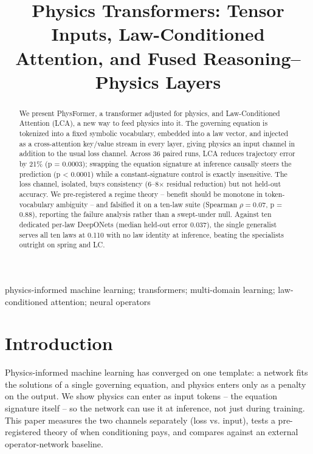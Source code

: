 \documentclass[conference,10pt]{IEEEtran}
\begin{document}
\title{Physics Transformers: Tensor Inputs, Law-Conditioned Attention, and Fused Reasoning--Physics Layers}

\author{
}

\maketitle

\begin{abstract}
We present PhysFormer, a transformer adjusted for physics, and Law-Conditioned Attention (LCA), a new way to feed physics into it. The governing equation is tokenized into a fixed symbolic vocabulary, embedded into a law vector, and injected as a cross-attention key/value stream in every layer, giving physics an input channel in addition to the usual loss channel. Across 36 paired runs, LCA reduces trajectory error by 21\% (p = 0.0003); swapping the equation signature at inference causally steers the prediction (p < 0.0001) while a constant-signature control is exactly insensitive. The loss channel, isolated, buys consistency (6--8$\times$ residual reduction) but not held-out accuracy. We pre-registered a regime theory -- benefit should be monotone in token-vocabulary ambiguity -- and falsified it on a ten-law suite (Spearman $\rho = 0.07$, p = 0.88), reporting the failure analysis rather than a swept-under null. Against ten dedicated per-law DeepONets (median held-out error 0.037), the single generalist serves all ten laws at 0.110 with no law identity at inference, beating the specialists outright on spring and LC.
\end{abstract}

\begin{IEEEkeywords}
physics-informed machine learning; transformers; multi-domain learning; law-conditioned attention; neural operators
\end{IEEEkeywords}

\section{Introduction}
Physics-informed machine learning has converged on one template: a network fits the solutions of a single governing equation, and physics enters only as a penalty on the output. We show physics can enter as input tokens -- the equation signature itself -- so the network can use it at inference, not just during training. This paper measures the two channels separately (loss vs. input), tests a pre-registered theory of when conditioning pays, and compares against an external operator-network baseline.
\end{document}
